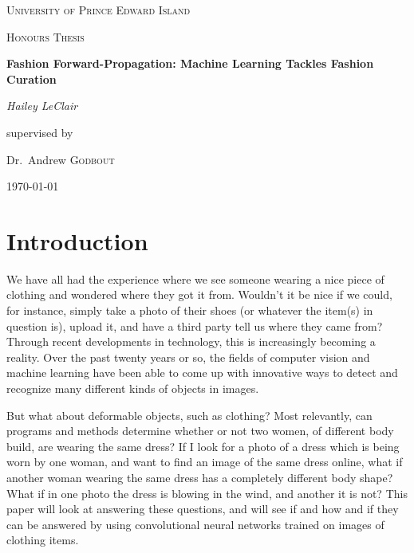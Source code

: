 \documentclass[12pt]{article} %
\begin{document}
\begin{titlepage}
\centering
    {\scshape\LARGE University of Prince Edward Island\par}
    \vspace{1cm}
    {\scshape\Large Honours Thesis\par}
    \vspace{1.5cm}
    {\huge\bfseries Fashion Forward-Propagation: Machine Learning Tackles Fashion Curation\par}
    \vspace{2cm}
    {\Large\itshape Hailey LeClair\par}
    \vfill
    supervised by\par
    Dr.~Andrew \textsc{Godbout}

\vfill

\today\par

\end{titlepage}


\section{Introduction}


	We have all had the experience where we see someone wearing a nice piece of clothing and wondered where they got it from. Wouldn't it be nice if we could, for instance, simply take a photo of their shoes (or whatever the item(s) in question is), upload it, and have a third party tell us where they came from? Through recent developments in technology, this is increasingly becoming a reality. Over the past twenty years or so, the fields of computer vision and machine learning have been able to come up with innovative ways to detect and recognize many different kinds of objects in images.

	But what about deformable objects, such as clothing? Most relevantly, can programs and methods determine whether or not two women, of different body build, are wearing the same dress? If I look for a photo of a dress which is being worn by one woman, and want to find an image of the same dress online, what if another woman wearing the same dress has a completely different body shape? What if in one photo the dress is blowing in the wind, and another it is not? This paper will look at answering these questions, and will see if and how and if they can be answered by using convolutional neural networks trained on images of clothing items. 
	
\end{document}
